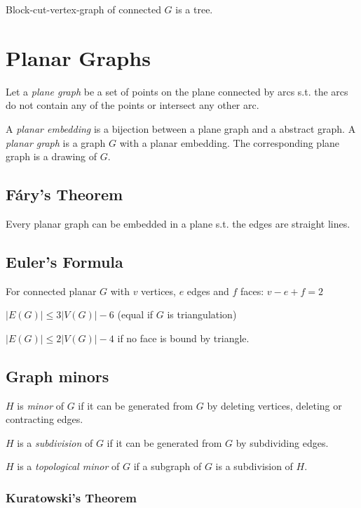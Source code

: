 Block-cut-vertex-graph of connected $G$ is a tree.

\section*{Planar Graphs}

Let a \emph{plane graph} be a set of points on the plane connected by arcs s.t. the arcs do not contain any of the points or intersect any other arc.

A \emph{planar embedding} is a bijection between a plane graph and a abstract graph.
A \emph{planar graph} is a graph $G$ with a planar embedding. The corresponding plane graph is a drawing of $G$.

\subsection*{F\'{a}ry's Theorem}

Every planar graph can be embedded in a plane s.t. the edges are straight lines.

\subsection*{Euler's Formula}

For connected planar $G$ with $v$ vertices, $e$ edges and $f$ faces: $v-e+f=2$

\spacing

$|E(G)| \leq 3|V(G)|-6$ (equal if $G$ is triangulation)

$|E(G)| \leq 2|V(G)|-4$ if no face is bound by triangle.

\subsection*{Graph minors}

$H$ is \emph{minor} of $G$ if it can be generated from $G$ by deleting vertices, deleting or contracting edges.

\spacing

$H$ is a \emph{subdivision} of $G$ if it can be generated from $G$ by subdividing edges.

\spacing

$H$ is a \emph{topological minor} of $G$ if a subgraph of $G$ is a subdivision of $H$.

\subsubsection*{Kuratowski's Theorem}

